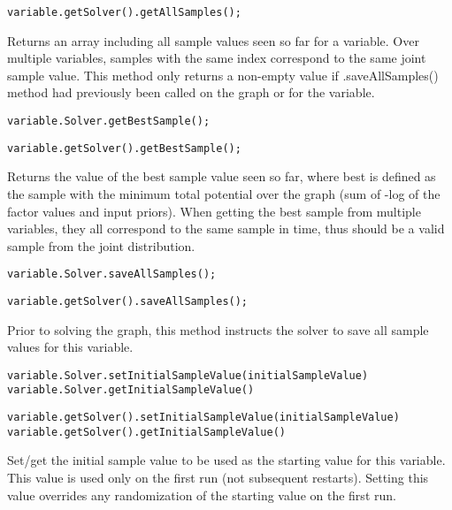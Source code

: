 \ifjava
\begin{lstlisting}
variable.getSolver().getAllSamples();
\end{lstlisting}
\fi

Returns an array including all sample values seen so far for a variable. Over multiple variables, samples with the same index correspond to the same joint sample value. This method only returns a non-empty value if .saveAllSamples() method had previously been called on the graph or for the variable.

\ifmatlab
\begin{lstlisting}
variable.Solver.getBestSample();
\end{lstlisting}
\fi

\ifjava
\begin{lstlisting}
variable.getSolver().getBestSample();
\end{lstlisting}
\fi


Returns the value of the best sample value seen so far, where best is defined as the sample with the minimum total potential over the graph (sum of -log of the factor values and input priors).  When getting the best sample from multiple variables, they all correspond to the same sample in time, thus should be a valid sample from the joint distribution.

\ifmatlab
\begin{lstlisting}
variable.Solver.saveAllSamples();
\end{lstlisting}
\fi

\ifjava
\begin{lstlisting}
variable.getSolver().saveAllSamples();
\end{lstlisting}
\fi

Prior to solving the graph, this method instructs the solver to save all sample values for this variable.

\ifmatlab
\begin{lstlisting}
variable.Solver.setInitialSampleValue(initialSampleValue)
variable.Solver.getInitialSampleValue()
\end{lstlisting}
\fi

\ifjava
\begin{lstlisting}
variable.getSolver().setInitialSampleValue(initialSampleValue)
variable.getSolver().getInitialSampleValue()
\end{lstlisting}
\fi

Set/get the initial sample value to be used as the starting value for this variable.  This value is used only on the first run (not subsequent restarts).  Setting this value overrides any randomization of the starting value on the first run.



